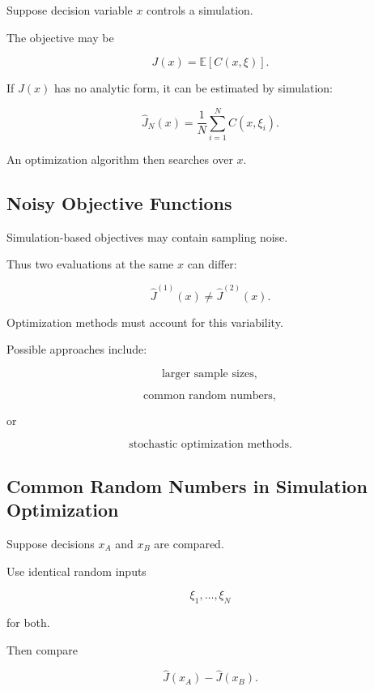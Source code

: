 Suppose decision variable \(x\) controls a simulation.

The objective may be

\[
\boxed{
J(x)
=
\mathbb{E}
[
C(x,\xi)
].
}
\]

If \(J(x)\) has no analytic form, it can be estimated by simulation:

\[
\boxed{
\widehat{J}_N(x)
=
\frac1N
\sum_{i=1}^{N}
C(x,\xi_i).
}
\]

An optimization algorithm then searches over \(x\).

\subsection{Noisy Objective Functions}
\label{subsec:noisy-simulation-objectives}

Simulation-based objectives may contain sampling noise.

Thus two evaluations at the same \(x\) can differ:

\[
\boxed{
\widehat{J}^{(1)}(x)
\neq
\widehat{J}^{(2)}(x).
}
\]

Optimization methods must account for this variability.

Possible approaches include:

\[
\boxed{
\text{larger sample sizes},
}
\]

\[
\boxed{
\text{common random numbers},
}
\]

or

\[
\boxed{
\text{stochastic optimization methods}.
}
\]

\subsection{Common Random Numbers in Simulation Optimization}
\label{subsec:simulation-common-random-numbers}

Suppose decisions \(x_A\) and \(x_B\) are compared.

Use identical random inputs

\[
\xi_1,\ldots,\xi_N
\]

for both.

Then compare

\[
\boxed{
\widehat{J}(x_A)
-
\widehat{J}(x_B).
}
\]

